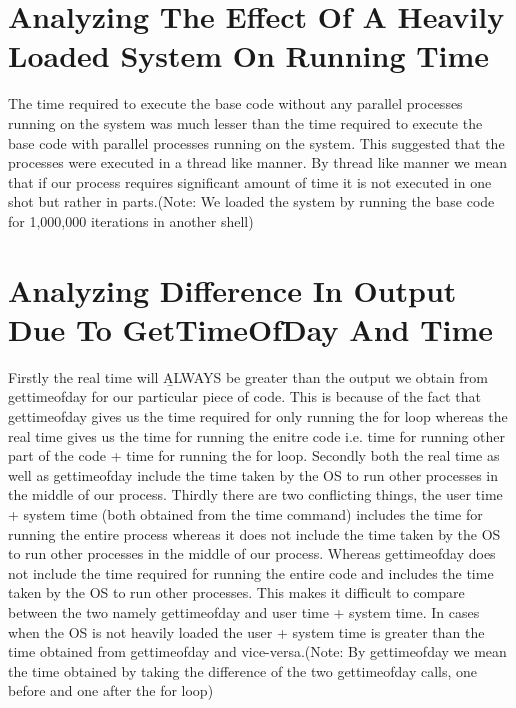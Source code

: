 \documentclass[11pt]{article}
\begin{document}
\section{Analyzing The Effect Of A Heavily Loaded System On Running Time}
	The time required to execute the base code without any parallel processes running on the system was much lesser than the time required to execute the base code with parallel processes running on the system. This suggested that the processes were executed in a thread like manner. By thread like manner we mean that if our process requires significant amount of time it is not executed in one shot but rather in parts.(Note: We loaded the system by running the base code for 1,000,000 iterations in another shell) 

\section{Analyzing Difference In Output Due To GetTimeOfDay And Time}
	Firstly the real time will \b{ALWAYS} be greater than the output we obtain from gettimeofday for our particular piece of code. This is because of the fact that gettimeofday gives us the time required for only running the for loop whereas the real time gives us the time for running the enitre code i.e. time for running other part of the code + time for running the for loop.\newline
	Secondly both the real time as well as gettimeofday include the time taken by the OS to run other processes in the middle of our process.\newline
	Thirdly there are two conflicting things, the user time + system time (both obtained from the time command) includes the time for running the entire process whereas it does not include the time taken by the OS to run other processes in the middle of our process. Whereas gettimeofday does not include the time required for running the entire code and includes the time taken by the OS to run other processes. This makes it difficult to compare between the two namely gettimeofday and user time + system time. In cases when the OS is not heavily loaded the user + system time is greater than the time obtained from gettimeofday and vice-versa.(Note: By gettimeofday we mean the time obtained by taking the difference of the two gettimeofday calls, one before and one after the for loop)
	
\end{document}

